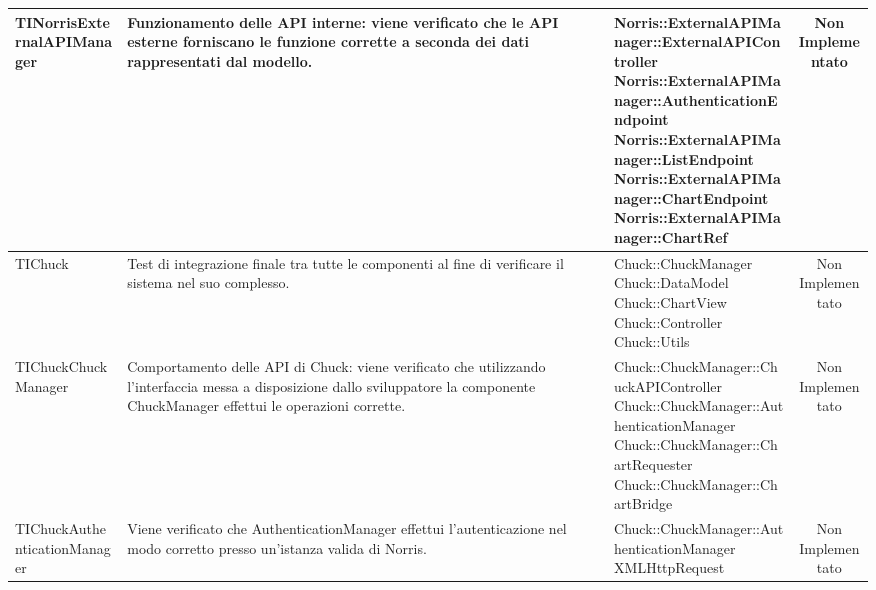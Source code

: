 \begin{table}[H]
\begin{center}
\begin{longtabu}{| X | X | X | c |}
	TINorrisExternalAPIManager
	&
Funzionamento delle API interne: viene verificato che le API esterne forniscano le funzione corrette a seconda dei dati rappresentati dal modello.
& \parbox[t]{0.4\textwidth}{
Norris::ExternalAPIManager::ExternalAPIController\\
Norris::ExternalAPIManager::AuthenticationEndpoint\\
Norris::ExternalAPIManager::ListEndpoint\\
Norris::ExternalAPIManager::ChartEndpoint\\
Norris::ExternalAPIManager::ChartRef}
			& Non Implementato
			\\ \hline











	TIChuck
				&
Test di integrazione finale tra tutte le componenti al fine di verificare il sistema nel suo complesso.
			& \parbox[t]{0.4\textwidth}{
Chuck::ChuckManager\\
Chuck::DataModel\\
Chuck::ChartView\\
Chuck::Controller\\
Chuck::Utils}
			& Non Implementato
			\\ \hline



	TIChuckChuckManager
				&
Comportamento delle API di Chuck: viene verificato che utilizzando l'interfaccia messa a disposizione dallo sviluppatore la componente ChuckManager effettui le operazioni corrette.
			& \parbox[t]{0.4\textwidth}{
Chuck::ChuckManager::ChuckAPIController\\
Chuck::ChuckManager::AuthenticationManager\\
Chuck::ChuckManager::ChartRequester\\
Chuck::ChuckManager::ChartBridge}
			& Non Implementato
			\\ \hline


	
	TIChuckAuthenticationManager
				&
Viene verificato che AuthenticationManager effettui l'autenticazione nel modo corretto presso un'istanza valida di Norris.
			& \parbox[t]{0.4\textwidth}{
Chuck::ChuckManager::AuthenticationManager\\
XMLHttpRequest}
			& Non Implementato
			\\ \hline




\end{longtabu}
\end{center}
\end{table}
